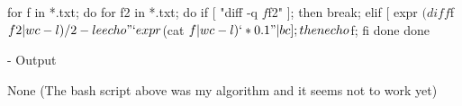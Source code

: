 \documentclass[10pt, a4paper]{article}
\begin{document}
\begin{verbbox}
for f in *.txt; do 
    for f2 in *.txt; do 
        if [ "diff -q $f $f2" ]; then 
            break; 
        elif [ expr $(diff $f $f2 | wc -l) / 2 -le 
                                    echo "`expr $(cat $f | wc -l)` * 0.1" | bc ]; then
            echo $f; 
        fi 
    done 
done
\end{verbbox}

\fbox{
\theverbbox
}

\noindent - Output

\begin{verbbox}
None (The bash script above was my algorithm and it seems not to work yet)
\end{verbbox}

\fbox{
\theverbbox
}
\end{document}
